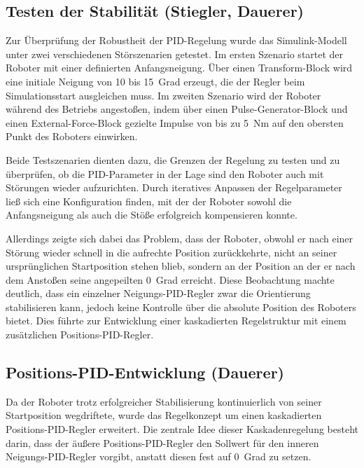 \documentclass[fontsize=12pt,
parskip=half,	%
department=FakM,  %
logostyle=flat,
twoside, %
DIV=15,BCOR=10mm, %
]{OTHRreprt}
\begin{document}
\subsection{Testen der Stabilität (Stiegler, Dauerer)}
\label{subsec:simulink_stoergroessen}

Zur Überprüfung der Robustheit der PID-Regelung wurde das Simulink-Modell unter zwei verschiedenen Störszenarien getestet. Im ersten Szenario startet der Roboter mit einer definierten Anfangsneigung. Über einen Transform-Block wird eine initiale Neigung von 10 bis 15~Grad erzeugt, die der Regler beim Simulationsstart ausgleichen muss. Im zweiten Szenario wird der Roboter während des Betriebs angestoßen, indem über einen Pulse-Generator-Block und einen External-Force-Block gezielte Impulse von bis zu 5~Nm auf den obersten Punkt des Roboters einwirken.

Beide Testszenarien dienten dazu, die Grenzen der Regelung zu testen und zu überprüfen, ob die PID-Parameter in der Lage sind den Roboter auch mit Störungen wieder aufzurichten. Durch iteratives Anpassen der Regelparameter ließ sich eine Konfiguration finden, mit der der Roboter sowohl die Anfangsneigung als auch die Stöße erfolgreich kompensieren konnte.

Allerdings zeigte sich dabei das Problem, dass der Roboter, obwohl er
nach einer Störung wieder schnell in die aufrechte Position zurückkehrte,
nicht an seiner ursprünglichen Startposition stehen blieb, sondern an der Position 
an der er nach dem Anstoßen seine angepeilten 0~Grad erreicht. 
Diese Beobachtung machte deutlich, dass ein einzelner Neigungs-PID-Regler zwar die Orientierung 
stabilisieren kann, jedoch keine Kontrolle über die absolute Position 
des Roboters bietet. Dies führte zur Entwicklung 
einer kaskadierten Regelstruktur mit einem zusätzlichen Positions-PID-Regler.

\subsection{Positions-PID-Entwicklung (Dauerer)}
\label{subsec:simulink_positions_pid}

Da der Roboter trotz erfolgreicher Stabilisierung kontinuierlich von seiner 
Startposition wegdriftete, wurde das Regelkonzept um einen kaskadierten Positions-PID-Regler erweitert.
Die zentrale Idee dieser Kaskadenregelung besteht darin, dass der äußere Positions-PID-Regler den 
Sollwert für den inneren Neigungs-PID-Regler vorgibt, anstatt diesen fest auf 0~Grad zu setzen.
\end{document}
